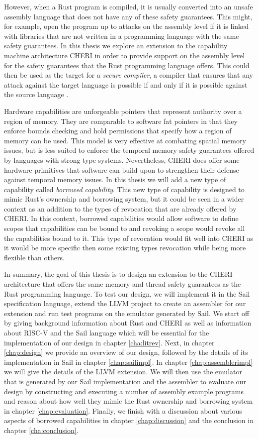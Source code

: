 However, when a Rust program is compiled, it is usually converted into an unsafe assembly language that does not have any of these safety guarantees.
This might, for example, open the program up to attacks on the assembly level if it is linked with libraries that are not written in a programming language with the same safety guarantees.
In this thesis we explore an extension to the capability machine architecture CHERI in order to provide support on the assembly level for the safety guarantees that the Rust programming language offers.
This could then be used as the target for a \textit{secure compiler}, a compiler that ensures that any attack against the target language is possible if and only if it is possible against the source language \cite{8049734}.

Hardware capabilities are unforgeable pointers that represent authority over a region of memory.
They are comparable to software fat pointers in that they enforce bounds checking and hold permissions that specify how a region of memory can be used.
This model is very effective at combating spatial memory issues, but is less suited to enforce the temporal memory safety guarantees offered by languages with strong type systems.
Nevertheless, CHERI does offer some hardware primitives that software can build upon to strengthen their defense against temporal memory issues.
In this thesis we will add a new type of capability called \textit{borrowed capability}.
This new type of capability is designed to mimic Rust's ownership and borrowing system, but it could be seen in a wider context as an addition to the types of revocation that are already offered by CHERI.
In this context, borrowed capabilities would allow software to define scopes that capabilities can be bound to and revoking a scope would revoke all the capabilities bound to it.
This type of revocation would fit well into CHERI as it would be more specific then some existing types revocation while being more flexible than others.

In summary, the goal of this thesis is to design an extension to the CHERI architecture that offers the same memory and thread safety guarantees as the Rust programming language.
To test our design, we will implement it in the Sail specification language, extend the LLVM project to create an assembler for our extension and run test programs on the emulator generated by Sail.
We start off by giving background information about Rust and CHERI as well as information about RISC-V and the Sail language which will be essential for the implementation of our design in chapter \ref{cha:litrev}.
Next, in chapter \ref{chap:design} we provide an overview of our design, followed by the details of its implementation in Sail in chapter \ref{chap:sailimpl}.
In chapter \ref{chap:assemblerimpl} we will give the details of the LLVM extension.
We will then use the emulator that is generated by our Sail implementation and the assembler to evaluate our design by constructing and executing a number of assembly example programs and reason about how well they mimic the Rust ownership and borrowing system in chapter \ref{chap:evaluation}.
Finally, we finish with a discussion about various aspects of borrowed capabilities in chapter \ref{chap:discussion} and the conclusion in chapter \ref{cha:conclusion}.

